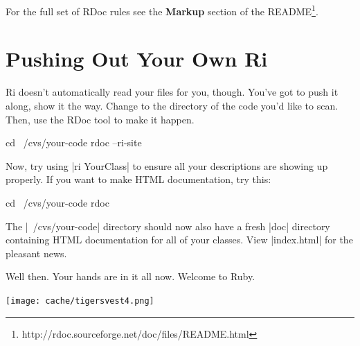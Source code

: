 \documentclass[12pt,twoside]{report}
\begin{document}
For the full set of RDoc rules see the \textbf{Markup} section of the
README\footnote{http://rdoc.sourceforge.net/doc/files/README.html}.

\section{Pushing Out Your Own Ri}

Ri doesn't automatically read your files for you, though. You've got
to push it along, show it the way. Change to the directory of the code
you'd like to scan. Then, use the RDoc tool to make it happen.

\begin{consolecode}
 cd ~/cvs/your-code
 rdoc --ri-site
\end{consolecode}

Now, try using \consoleinline|ri YourClass| to ensure
all your descriptions are showing up properly. If you want to make
HTML documentation, try this:

\begin{consolecode}
 cd ~/cvs/your-code
 rdoc
\end{consolecode}

The \consoleinline|~/cvs/your-code| directory should now
also have a fresh \consoleinline|doc| directory
containing HTML documentation for all of your classes. View
\consoleinline|index.html| for the pleasant news.

Well then. Your hands are in it all now. Welcome to Ruby.

\vfill
\newpage

\texttt{[image: cache/tigersvest4.png]} 

\newpage
\thispagestyle{empty}
\mbox{}
\newpage
\thispagestyle{empty}
\begin{center}
\vspace*{2.7in}
\manrotatedquadrifolium
\end{center}
\end{document}
